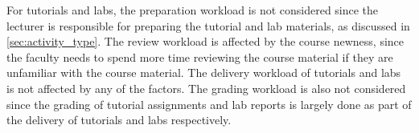For tutorials and labs, the preparation workload is not considered since the lecturer is responsible for preparing the tutorial and lab materials, as discussed in \autoref{sec:activity_type}. The review workload is affected by the course newness, since the faculty needs to spend more time reviewing the course material if they are unfamiliar with the course material. The delivery workload of tutorials and labs is not affected by any of the factors. The grading workload is also not considered since the grading of tutorial assignments and lab reports is largely done as part of the delivery of tutorials and labs respectively.






